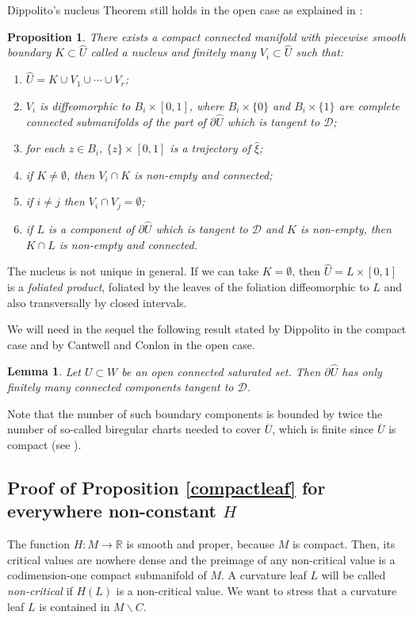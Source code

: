 \documentclass[JEP,XML,SOM,Unicode]{cedram}
\let\mathcal\mathscr
\let\moins\smallsetminus
\newtheorem{lemma}[theorem]{Lemma}
\newtheorem{proposition}[theorem]{Proposition}
\theoremstyle{definition}
\theoremstyle{remark}
\numberwithin{equation}{section}
\newcommand{\RR}{\mathbb R}
\begin{document}
Dippolito's nucleus Theorem still holds in the open case as explained in \cite[\S4]{CaC}:
\begin{proposition}
There exists a
compact connected manifold with piecewise smooth boundary $K\subset \wideparen{U}$ called a \emph{nucleus}
and finitely many $V_i\subset \wideparen{U}$ such that:
\begin{enumerate}
\item $\wideparen{U}=K\cup V_1\cup\cdots\cup V_r$;
\item $V_i$ is diffeomorphic to $B_i\times [0,1]$, where $B_i\times\{0\}$ and
$B_i\times\{1\}$ are complete connected submanifolds of the part of $\partial \wideparen{U}$ which is tangent to $\mathcal D$;
\item for each $z\in B_i$, $\{z\}\times [0,1]$ is a trajectory of $\widehat{\xi}$;
\item if $K\neq\emptyset$, then $V_i\cap K$ is non-empty and connected;
\item if $i\neq j$ then $V_i\cap V_j=\emptyset$;
\item if $L$ is a component of $\partial\wideparen U$ which is tangent to $\mathcal D$ and $K$ is non-empty,
then $K\cap L$ is non-empty and connected.
\end{enumerate}
\end{proposition}
The nucleus is not unique in general. If we can take $K=\emptyset$, then $\wideparen{U}=L\times [0,1]$ is a
\emph{foliated product}, foliated by the leaves of the foliation diffeomorphic to $L$ and also transversally by closed intervals.

We will need in the sequel the following result stated by Dippolito \cite[Prop.\,2]{Dip} in the compact case and by Cantwell and Conlon \cite[Lem.\,4.2]{CaC} in the open case.
\begin{lemma}\label{finiteborder}
Let $U\subset W$ be an open connected saturated set.
Then $\partial \wideparen{U}$ has only finitely many connected components tangent to $\mathcal D$.
\end{lemma}
Note that the number of such boundary components is bounded by twice the number of
so-called biregular charts needed to cover $\overline{U}$, which is finite since $\overline{U}$ is compact (see \cite{Dip}).

\subsection{Proof of Proposition \ref{compactleaf} for everywhere non-constant $H$}\label{sect:noncritical}
The function $H:M\to \RR$ is smooth and proper, because $M$ is compact.
Then, its critical values are nowhere dense and the preimage
of any non-critical value is a codimension-one compact
submanifold of $M$. A curvature leaf $L$
will be called \emph{non-critical} if $H(L)$ is a non-critical value.
We want to stress that a curvature leaf $L$ is contained in $M\moins C$.
\end{document}
